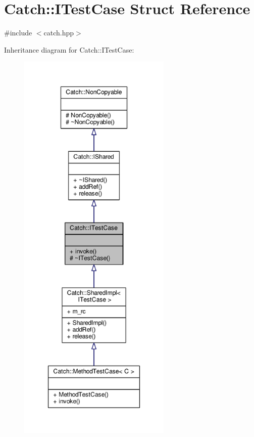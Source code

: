 \hypertarget{struct_catch_1_1_i_test_case}{\section{Catch\-:\-:I\-Test\-Case Struct Reference}
\label{struct_catch_1_1_i_test_case}
}


{\ttfamily \#include $<$catch.\-hpp$>$}



Inheritance diagram for Catch\-:\-:I\-Test\-Case\-:
\nopagebreak
\begin{figure}[H]
\begin{center}
\leavevmode
\includegraphics[height=550pt]{struct_catch_1_1_i_test_case__inherit__graph}
\end{center}
\end{figure}


